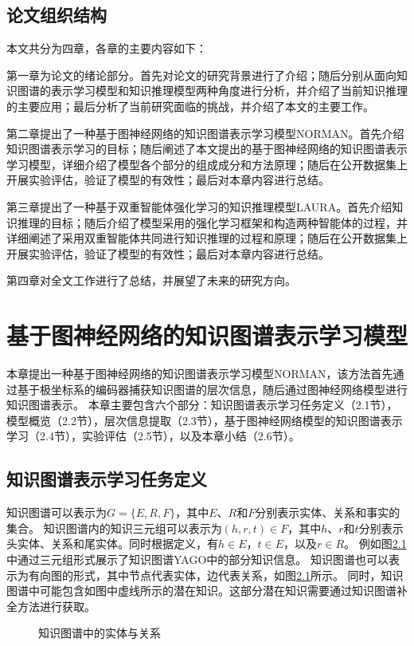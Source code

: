 \documentclass[algorithmlist, AutoFakeBold, AutoFakeSlant, figurelist, tablelist, nomlist, engineering, openany]{seuthesix} %
\begin{document}
\section{论文组织结构}
本文共分为四章，各章的主要内容如下：

第一章为论文的绪论部分。首先对论文的研究背景进行了介绍；随后分别从面向知识图谱的表示学习模型和知识推理模型两种角度进行分析，并介绍了当前知识推理的主要应用；最后分析了当前研究面临的挑战，并介绍了本文的主要工作。

第二章提出了一种基于图神经网络的知识图谱表示学习模型NORMAN。首先介绍知识图谱表示学习的目标；随后阐述了本文提出的基于图神经网络的知识图谱表示学习模型，详细介绍了模型各个部分的组成成分和方法原理；随后在公开数据集上开展实验评估，验证了模型的有效性；最后对本章内容进行总结。

第三章提出了一种基于双重智能体强化学习的知识推理模型LAURA。首先介绍知识推理的目标；随后介绍了模型采用的强化学习框架和构造两种智能体的过程，并详细阐述了采用双重智能体共同进行知识推理的过程和原理；随后在公开数据集上开展实验评估，验证了模型的有效性；最后对本章内容进行总结。

第四章对全文工作进行了总结，并展望了未来的研究方向。


\chapter{基于图神经网络的知识图谱表示学习模型}
本章提出一种基于图神经网络的知识图谱表示学习模型NORMAN，该方法首先通过基于极坐标系的编码器捕获知识图谱的层次信息，随后通过图神经网络模型进行知识图谱表示。
本章主要包含六个部分：知识图谱表示学习任务定义（2.1节），模型概览（2.2节），层次信息提取（2.3节），基于图神经网络模型的知识图谱表示学习（2.4节），实验评估（2.5节），以及本章小结（2.6节）。

\section{知识图谱表示学习任务定义}
知识图谱可以表示为$G=\{E, R, F\}$，其中$E$、$R$和$F$分别表示实体、关系和事实的集合。
知识图谱内的知识三元组可以表示为$(h, r, t) \in F$，其中$h$、$r$和$t$分别表示头实体、关系和尾实体。同时根据定义，有$h \in E$，$t \in E$，以及$r \in R$。
例如图\ref{2_KG}中通过三元组形式展示了知识图谱YAGO中的部分知识信息。
知识图谱也可以表示为有向图的形式，其中节点代表实体，边代表关系，如图\ref{2_KG}所示。
同时，知识图谱中可能包含如图中虚线所示的潜在知识。这部分潜在知识需要通过知识图谱补全方法进行获取。
\begin{figure}[H]
  \centering
  \caption{知识图谱中的实体与关系}
  \label{2_KG}
\end{figure}
\end{document}
